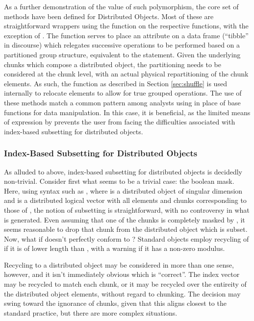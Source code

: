 As a further demonstration of the value of such polymorphism, the core set of  methods have been defined for Distributed Objects.
Most of these are straightforward wrappers using the  function on the respective  functions, with the exception of .
The  function serves to place an attribute on a data frame (``tibble'' in  discourse) which relegates successive operations to be performed based on a partitioned group structure, equivalent to the   statement.
Given the underlying chunks which compose a distributed object, the partitioning needs to be considered at the chunk level, with an actual physical repartitioning of the chunk elements.
As such, the  function as described in Section \cref{sec:shuffle} is used internally to relocate elements to allow for true grouped operations.
The use of these methods match a common pattern among analysts using  in place of base \R functions for data manipulation.
In this case, it is beneficial, as the limited means of expression by  prevents the user from facing the difficulties associated with index-based subsetting for distributed objects.

\subsubsection{Index-Based Subsetting for Distributed Objects}

As alluded to above, index-based subsetting for distributed objects is decidedly non-trivial.
Consider first what seems to be a trivial case: the boolean mask.
Here, using syntax such as , where  is a distributed object of singular dimension and  is a distributed logical vector with all elements and chunks corresponding to those of , the notion of subsetting is straightforward, with no controversy in what is generated.
Even assuming that one of the chunks is completely masked by , it seems reasonable to drop that chunk from the distributed object which is subset.
Now, what if  doesn't perfectly conform to ?
Standard \R objects employ recycling of  if it is of lower length than , with a warning if it has a non-zero modulus.

Recycling to a distributed object may be considered in more than one sense, however, and it isn't immediately obvious which is ``correct''.
The index vector may be recycled to match each chunk, or it may be recycled over the entireity of the distributed object elements, without regard to chunking.
The decision may swing toward the ignorance of chunks, given that this aligns closest to the standard \R practice, but there are more complex situations.

